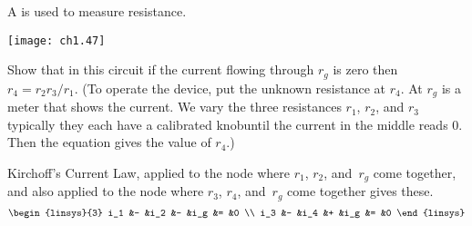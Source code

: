\begin{exercises}
\item \label{exer:WheatstoneBr} 
   A 
   is used to measure resistance. 
   \begin{center}
     \texttt{[image: ch1.47]}
   \end{center}
   Show that in this circuit if the current
   flowing through $r_g$ is zero then $r_4=r_2r_3/r_1$.
   (To operate the device, put the unknown
   resistance at $r_4$.
   At $r_g$ is a meter that shows the current.
   We vary the three resistances $r_1$, $r_2$, and $r_3$\Dash typically
   they each have a calibrated knob\Dash until the 
   current in the middle reads $0$.
   Then the equation gives the value of $r_4$.)
   \begin{answer}
     Kirchoff's Current Law, applied to the node where 
     $r_1$, $r_2$, and~$r_g$ come together, and also 
     applied to the node where $r_3$, $r_4$, and~$r_g$ come
     together gives these.
     \begin{equation*}
       \begin{linsys}{3}
         i_1 &- &i_2 &- &i_g &= &0  \\
         i_3 &- &i_4 &+ &i_g &= &0  
       \end{linsys}

\end{equation*}
\end{answer}
\end{exercises}
